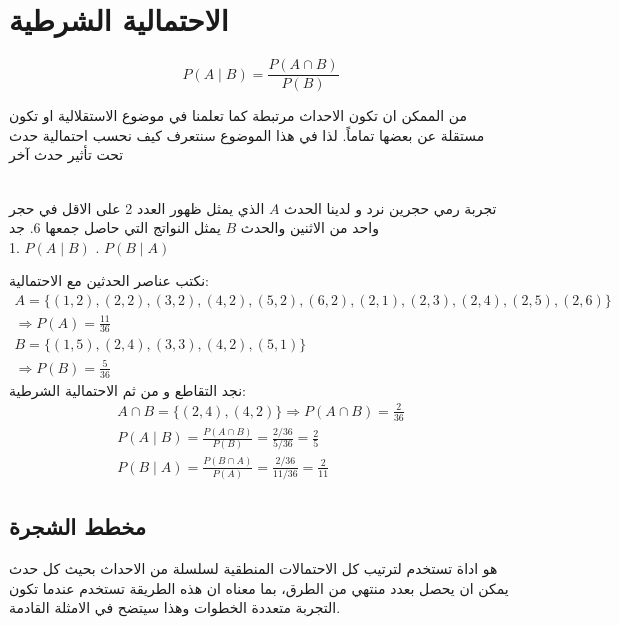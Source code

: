 \section{الاحتمالية الشرطية }

\begin{definition}
	\[
	P(A\mid B) = \frac{P(A\cap B)}{P(B)}
	\]
\end{definition}
من الممكن ان تكون الاحداث مرتبطة كما تعلمنا في موضوع الاستقلالية او تكون مستقلة عن بعضها تماماً. لذا في هذا الموضوع سنتعرف كيف نحسب احتمالية حدث تحت تأثير حدث آخر \newpage

\begin{example}
	\\
تجربة رمي حجرين نرد و لدينا الحدث \(A\) الذي يمثل ظهور العدد 2 على الاقل في حجر واحد من الاثنين والحدث \(B\) يمثل النواتج التي حاصل جمعها 6. جد\\
1. \(P(A\mid B)\) . \(P(B\mid A)\)
\end{example}

\begin{solution}
	نكتب عناصر الحدثين مع الاحتمالية:
	\begin{gather*}
		A = \{(1,2), (2,2), (3,2), (4,2), (5, 2), (6,2), (2,1), (2,3), (2,4), (2,5), (2,6)\}\\
		\Rightarrow P(A) = \frac{11}{36}\\
		B = \{(1,5), (2,4), (3,3), (4,2), (5,1)\}\\
		\Rightarrow P(B) = \frac{5}{36}
	\end{gather*}
	نجد التقاطع و من ثم الاحتمالية الشرطية:
	\begin{gather*}
		A\cap B = \{(2, 4), (4, 2)\} \Rightarrow P(A \cap B) = \frac{2}{36}\\
		P(A\mid B) = \frac{P(A\cap B)}{P(B)} = \frac{2/36}{5/36} = \frac{2}{5}\\
		P(B\mid A) = \frac{P(B\cap A)}{P(A)} = \frac{2/36}{11/36} = \frac{2}{11}
	\end{gather*}
\end{solution}

\newpage

\subsection*{مخطط الشجرة }
هو اداة تستخدم لترتيب كل الاحتمالات المنطقية لسلسلة من الاحداث بحيث كل حدث يمكن ان يحصل بعدد منتهي من الطرق، بما معناه ان هذه الطريقة تستخدم عندما تكون التجربة متعددة الخطوات وهذا سيتضح في الامثلة القادمة.

